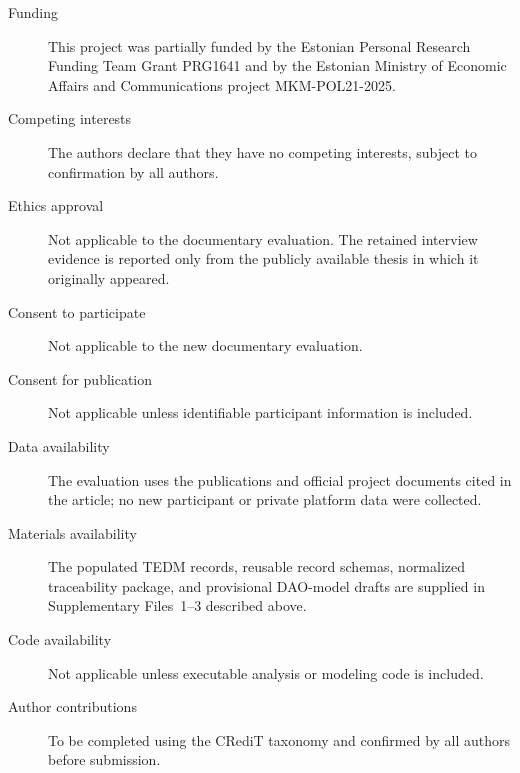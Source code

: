 \documentclass[referee,sn-basic]{sn-jnl}
\newif\ifblindreview
\begin{document}
\begin{description}
  \item[Funding] \ifblindreview Funding information is withheld for double-anonymous review.\else This project was partially funded by the Estonian Personal Research Funding Team Grant PRG1641 and by the Estonian Ministry of Economic Affairs and Communications project MKM-POL21-2025.\fi
  \item[Competing interests] The authors declare that they have no competing interests, subject to confirmation by all authors.
  \item[Ethics approval] Not applicable to the documentary evaluation. The retained interview evidence is reported only from the publicly available thesis in which it originally appeared.
  \item[Consent to participate] Not applicable to the new documentary evaluation.
  \item[Consent for publication] Not applicable unless identifiable participant information is included.
  \item[Data availability] The evaluation uses the publications and official project documents cited in the article; no new participant or private platform data were collected.
  \item[Materials availability] The populated TEDM records, reusable record schemas, normalized traceability package, and provisional DAO-model drafts are supplied in Supplementary Files~1--3 described above.
  \item[Code availability] Not applicable unless executable analysis or modeling code is included.
  \item[Author contributions] To be completed using the CRediT taxonomy and confirmed by all authors before submission.
\end{description}


\end{document}

